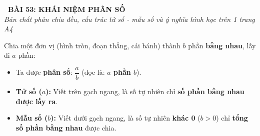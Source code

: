 \documentclass[14pt,a4paper,oneside]{extbook}
\begin{document}
\noindent
\begin{tcolorbox}[
  enhanced,
  colback=teal!8!white,
  colframe=teal!80!black,
  arc=3mm, boxrule=1pt,
  left=3mm, right=3mm, top=2mm, bottom=2mm,
  halign=center
]
  {\Large\bfseries\color{teal!90!black}\faBookmark\ BÀI 53: KHÁI NIỆM PHÂN SỐ}\\[1.5pt]
  {\footnotesize\itshape\color{black!75} Bản chất phân chia đều, cấu trúc tử số - mẫu số và ý nghĩa hình học trên 1 trang A4}
\end{tcolorbox}

\vspace{-2.5mm}

\noindent
\begin{minipage}[t]{0.49\textwidth}\vspace{0pt}
\begin{tcolorbox}[
  enhanced,
  colback=blue!4!white,
  colframe=blue!75!black,
  arc=2mm, boxrule=0.8pt,
  left=2mm, right=2mm, top=1.8mm, bottom=1.8mm,
  title={\footnotesize\bfseries\color{white}\faPieChart\ 1. Khái niệm phân số}
]
{\footnotesize
Chia một đơn vị (hình tròn, đoạn thẳng, cái bánh) thành $b$ phần \textbf{bằng nhau}, lấy đi $a$ phần:
\begin{itemize}\setlength{\itemsep}{1pt}\setlength{\leftskip}{-2.5mm}
  \item Ta được \textbf{phân số}: $\dfrac{a}{b}$ (đọc là: \textbf{$a$ phần $b$}).
  \item \textbf{Tử số ($a$):} Viết trên gạch ngang, là số tự nhiên chỉ \textbf{số phần bằng nhau được lấy ra}.
  \item \textbf{Mẫu số ($b$):} Viết dưới gạch ngang, là số tự nhiên \textbf{khác 0} ($b > 0$) chỉ \textbf{tổng số phần bằng nhau} được chia.
\end{itemize}
}
\end{tcolorbox}
\end{minipage}
\hfill
\end{document}
